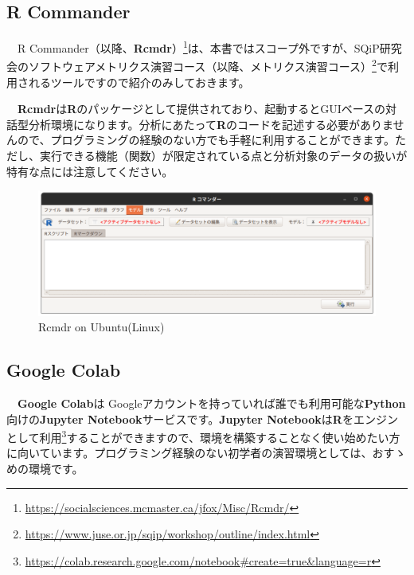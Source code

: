 \documentclass[
  12pt,
]{book}
\DeclareRobustCommand{\href}[2]{#2\footnote{\url{#1}}}
\begin{document}
\hypertarget{r-commander}{%
\subsection{\texorpdfstring{R Commander}{R Commander}}\label{r-commander}}

　\href{https://socialsciences.mcmaster.ca/jfox/Misc/Rcmdr/}{R Commander（以降、\textbf{Rcmdr}）}は、本書ではスコープ外ですが、\href{https://www.juse.or.jp/sqip/workshop/outline/index.html}{SQiP研究会のソフトウェアメトリクス演習コース（以降、メトリクス演習コース）}で利用されるツールですので紹介のみしておきます。

　\textbf{Rcmdr}は\textbf{R}のパッケージとして提供されており、起動するとGUIベースの対話型分析環境になります。分析にあたって\textbf{R}のコードを記述する必要がありませんので、プログラミングの経験のない方でも手軽に利用することができます。ただし、実行できる機能（関数）が限定されている点と分析対象のデータの扱いが特有な点には注意してください。

\begin{figure}[H]

{\centering \includegraphics[width=0.9\linewidth,]{./fig/RCmdr} 

}

\caption{Rcmdr on Ubuntu(Linux)}\label{fig:unnamed-chunk-14}
\end{figure}

\hypertarget{google-colab}{%
\subsection{\texorpdfstring{Google Colab}{Google Colab}}\label{google-colab}}

　\textbf{Google Colab}は Googleアカウントを持っていれば誰でも利用可能な\textbf{Python}向けの\textbf{Jupyter Notebook}サービスです。\href{https://colab.research.google.com/notebook\#create=true\&language=r}{\textbf{Jupyter Notebook}は\textbf{R}をエンジンとして利用}することができますので、環境を構築することなく使い始めたい方に向いています。プログラミング経験のない初学者の演習環境としては、おすゝめの環境です。
\end{document}
